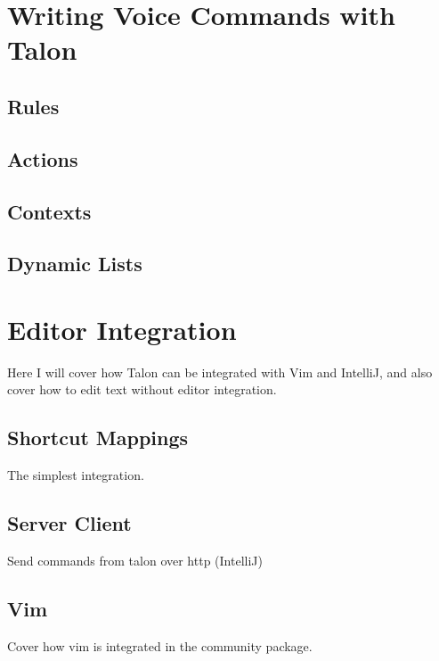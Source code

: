 \documentclass[../thesis.tex]{subfiles}
\begin{document}
\section{Writing Voice Commands with Talon}\label{wvc}
\subsection{Rules}
\subsection{Actions}
\subsection{Contexts}
\subsection{Dynamic Lists}

\section{Editor Integration}
Here I will cover how Talon can be integrated with Vim and IntelliJ, and also cover how to edit text without editor integration.
\subsection{Shortcut Mappings}
The simplest integration. 
\subsection{Server Client}
Send commands from talon over http (IntelliJ)
\subsection{Vim}
Cover how vim is integrated in the community package.
\end{document}
